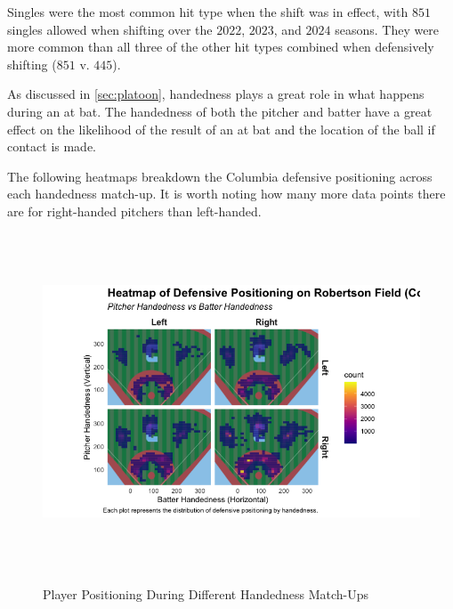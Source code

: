 \documentclass{article}
\begin{document}
Singles were the most common hit type when the shift was in effect, with $851$ singles allowed when shifting over the $2022$, $2023$, and $2024$ seasons. They were more common than all three of the other hit types combined when defensively shifting ($851$ v. $445$). 

As discussed in \ref{sec:platoon}, handedness plays a great role in what happens during an at bat. The handedness of both the pitcher and batter have a great effect on the likelihood of the result of an at bat and the location of the ball if contact is made. 

The following heatmaps breakdown the Columbia defensive positioning across each handedness match-up. 
It is worth noting how many more data points there are for right-handed pitchers than left-handed. 

\begin{figure}[h!]
    \centering
    \begin{minipage}{\textwidth}
        \centering
        \includegraphics[height=10cm]{images/handedness_heatmap.png}
        \caption{Player Positioning During Different Handedness Match-Ups}
        \cite{trackman2022} \cite{trackman2023} \cite{trackman2024} \cite{albert2023analyzing}
    \end{minipage}

    \vspace{0.5cm} 


\end{figure}
\end{document}

